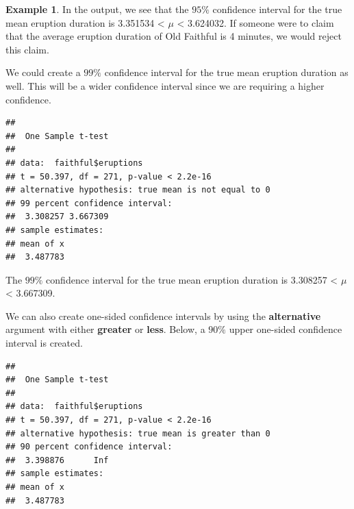 \documentclass[
  11pt,
  oneside]{book}
\newenvironment{Shaded}{\begin{snugshade}}{\end{snugshade}}
\newcommand{\AttributeTok}[1]{\textcolor[rgb]{0.13,0.29,0.53}{#1}}
\newcommand{\FloatTok}[1]{\textcolor[rgb]{0.00,0.00,0.81}{#1}}
\newcommand{\FunctionTok}[1]{\textcolor[rgb]{0.13,0.29,0.53}{\textbf{#1}}}
\newcommand{\NormalTok}[1]{#1}
\newcommand{\SpecialCharTok}[1]{\textcolor[rgb]{0.81,0.36,0.00}{\textbf{#1}}}
\newcommand{\StringTok}[1]{\textcolor[rgb]{0.31,0.60,0.02}{#1}}
\theoremstyle{definition}
\theoremstyle{definition}
\newtheorem{example}{Example}[chapter]
\theoremstyle{definition}
\theoremstyle{definition}
\theoremstyle{remark}
\begin{document}
\begin{example}
In the output, we see that the \(95\%\) confidence interval for the true mean eruption duration is 3.351534 \textless{} \(\mu\) \textless{} 3.624032. If someone were to claim that the average eruption duration of Old Faithful is 4 minutes, we would reject this claim.

We could create a \(99\%\) confidence interval for the true mean eruption duration as well. This will be a wider confidence interval since we are requiring a higher confidence.

\begin{Shaded}
\end{Shaded}

\begin{verbatim}
## 
##  One Sample t-test
## 
## data:  faithful$eruptions
## t = 50.397, df = 271, p-value < 2.2e-16
## alternative hypothesis: true mean is not equal to 0
## 99 percent confidence interval:
##  3.308257 3.667309
## sample estimates:
## mean of x 
##  3.487783
\end{verbatim}

The \(99\%\) confidence interval for the true mean eruption duration is 3.308257 \textless{} \(\mu\) \textless{} 3.667309.

We can also create one-sided confidence intervals by using the \textbf{alternative} argument with either \textbf{greater} or \textbf{less}. Below, a \(90\%\) upper one-sided confidence interval is created.

\begin{Shaded}
\end{Shaded}

\begin{verbatim}
## 
##  One Sample t-test
## 
## data:  faithful$eruptions
## t = 50.397, df = 271, p-value < 2.2e-16
## alternative hypothesis: true mean is greater than 0
## 90 percent confidence interval:
##  3.398876      Inf
## sample estimates:
## mean of x 
##  3.487783
\end{verbatim}


\end{example}
\end{document}
